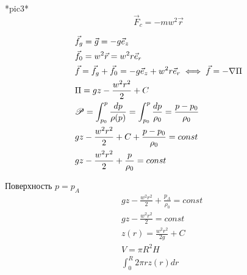 *pic3*
\[
  \vec{F}_c = -mw^2 \vec{r}
\]


\begin{align*}
  &\vec{f}_g = \vec{g} = -g \vec{e}_z \\
  &\vec{f}_0 = w^2 \vec{r} = w^2 r \vec{e}_r \\
  &\vec{f} = \vec{f}_g + \vec{f}_0 = -g\vec{e}_z + w^2 r \vec{e}_r \iff \vec{f} = -\nabla \Pi \\
  &\Pi = gz - \frac{w^2r^2}{2} + C\\
  &\P = \int_{p_0}^p \frac{dp}{\rho(p)} = \int_{p_0}^p  \frac{dp}{\rho_0} = \frac{p - p_0}{\rho_0}\\
  &gz - \frac{w^2r^2}{2} + C + \frac{p - p_0}{\rho_0} = const \\
  &gz - \frac{w^2r^2}{2} + \frac{p}{\rho_0} = const
\end{align*}

Поверхность $p = p_A$
\begin{align*}
  &gz - \frac{w^2r^2}{2} + \frac{p_A}{\rho_0} = const \\
  &gz - \frac{w^2r^2}{2} = const \\
  &z(r) = \frac{w^2r^2}{2g} + C\\
  &V = \pi R^2 H \\
  &\int_0^R 2 \pi r z(r) dr
\end{align*}

